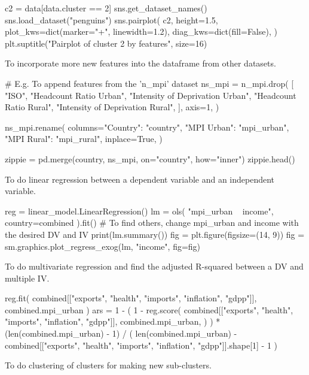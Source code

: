 \documentclass{swfuthesise}
\begin{document}
\begin{pythoncode}
c2 = data[data.cluster == 2]
sns.get_dataset_names()
sns.load_dataset("penguins")
sns.pairplot(
    c2,
    height=1.5,
    plot_kws=dict(marker="+", linewidth=1.2),
    diag_kws=dict(fill=False),
)
plt.suptitle("Pairplot of cluster 2 by features", size=16)
\end{pythoncode}

To incorporate more new features into the dataframe from other datasets. 

\begin{pythoncode}
# E.g. To append features from the 'n_mpi' dataset
ns_mpi = n_mpi.drop(
    [
        "ISO",
        "Headcount Ratio Urban",
        "Intensity of Deprivation Urban",
        "Headcount Ratio Rural",
        "Intensity of Deprivation Rural",
    ],
    axis=1,
)

ns_mpi.rename(
    columns={"Country": "country", "MPI Urban": "mpi_urban", "MPI Rural": "mpi_rural"},
    inplace=True,
)

zippie = pd.merge(country, ns_mpi, on="country", how="inner")
zippie.head()
\end{pythoncode}

To do linear regression between a dependent variable and an independent variable. 

\begin{pythoncode}
reg = linear_model.LinearRegression()
lm = ols(
    "mpi_urban ~ income", country=combined
).fit()  # To find others, change mpi_urban and income with the desired DV and IV
print(lm.summary())
fig = plt.figure(figsize=(14, 9))
fig = sm.graphics.plot_regress_exog(lm, "income", fig=fig)
\end{pythoncode}

To do multivariate regression and find the adjusted R-squared between a DV and multiple IV.

\begin{pythoncode}
reg.fit(
    combined[["exports", "health", "imports", "inflation", "gdpp"]], combined.mpi_urban
)
ars = 1 - (
    1
    - reg.score(
        combined[["exports", "health", "imports", "inflation", "gdpp"]],
        combined.mpi_urban,
    )
) * (len(combined.mpi_urban) - 1) / (
    len(combined.mpi_urban)
    - combined[["exports", "health", "imports", "inflation", "gdpp"]].shape[1]
    - 1
)
\end{pythoncode}

To do clustering of clusters for making new sub-clusters. 
\end{document}

